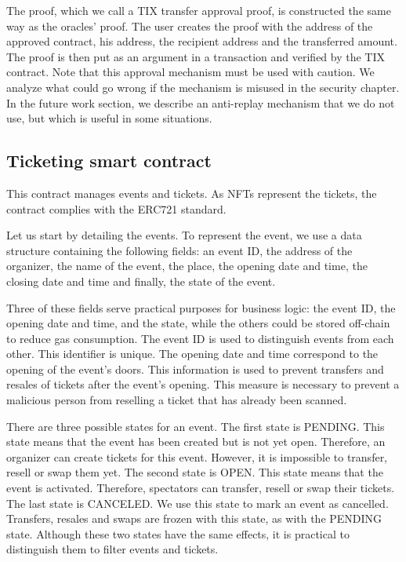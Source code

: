 \documentclass[a4paper,11pt,oneside]{report}
\begin{document}
The proof, which we call a TIX transfer approval proof, is constructed the same way as the oracles' proof. The user creates the proof with the address of the approved contract, his address, the recipient address and the transferred amount. The proof is then put as an argument in a transaction and verified by the TIX contract. Note that this approval mechanism must be used with caution. We analyze what could go wrong if the mechanism is misused in the security chapter. In the future work section, we describe an anti-replay mechanism that we do not use, but which is useful in some situations.

\subsection{Ticketing smart contract}
This contract manages events and tickets. As NFTs represent the tickets, the contract complies with the ERC721 standard.

Let us start by detailing the events. To represent the event, we use a data structure containing the following fields: an event ID, the address of the organizer, the name of the event, the place, the opening date and time, the closing date and time and finally, the state of the event. 

Three of these fields serve practical purposes for business logic: the event ID, the opening date and time, and the state, while the others could be stored off-chain to reduce gas consumption. The event ID is used to distinguish events from each other. This identifier is unique. The opening date and time correspond to the opening of the event's doors. This information is used to prevent transfers and resales of tickets after the event's opening. This measure is necessary to prevent a malicious person from reselling a ticket that has already been scanned.

There are three possible states for an event. The first state is PENDING. This state means that the event has been created but is not yet open. Therefore, an organizer can create tickets for this event. However, it is impossible to transfer, resell or swap them yet. The second state is OPEN. This state means that the event is activated. Therefore, spectators can transfer, resell or swap their tickets. The last state is CANCELED. We use this state to mark an event as cancelled. Transfers, resales and swaps are frozen with this state, as with the PENDING state. Although these two states have the same effects, it is practical to distinguish them to filter events and tickets.
\end{document}
